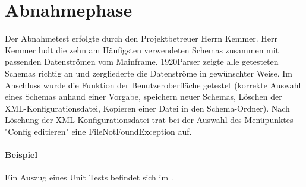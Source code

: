 \section{Abnahmephase} 
\label{sec:Abnahmephase}
Der Abnahmetest erfolgte durch den Projektbetreuer Herrn Kemmer. Herr Kemmer ludt die zehn am Häufigsten verwendeten Schemas zusammen mit passenden Datenströmen vom Mainframe. 1920Parser zeigte alle getesteten Schemas richtig an und zergliederte die Datenströme in gewünschter Weise. Im Anschluss wurde die Funktion der Benutzeroberfläche getestet (korrekte Auswahl eines Schemas anhand einer Vorgabe, speichern neuer Schemas, Löschen der XML-Konfigurationsdatei, Kopieren einer Datei in den Schema-Ordner). Nach Löschung der XML-Konfigurationsdatei trat bei der Auswahl des Menüpunktes "Config editieren" eine FileNotFoundException auf. 

\paragraph{Beispiel}
Ein Auszug eines Unit Tests befindet sich im .


